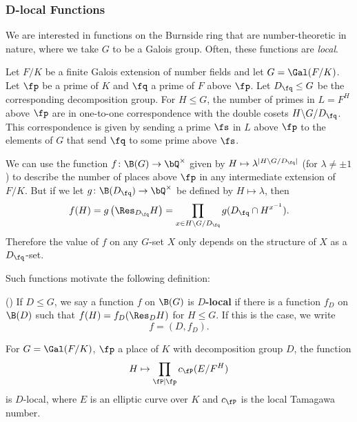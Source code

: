 \subsubsection{D-local Functions}\label{D-loc}

We are interested in functions on the Burnside ring that are number-theoretic in nature, where we take $G$ to be a Galois group. Often, these functions are \textit{local}. 

\begin{example}
Let $F / K$ be a finite Galois extension of number fields and let $G = \Gal(F / K)$. Let $\fp$ be a prime of $K$ and $\fq$ a prime of $F$ above $\fp$. Let $D_{\fq} \leq G$ be the corresponding decomposition group. For $H \leq G$, the number of primes in $L = F^{H}$ above $\fp$ are in one-to-one correspondence with the double cosets $H \backslash G / D_{\fq}$. This correspondence is given by sending a prime $\fs$ in $L$ above $\fp$ to the elements of $G$ that send $\fq$ to some prime above $\fs$.

We can use the function $f \colon \B(G) \to \bQ^{\times}$ given by $H \mapsto  \lambda^{| H \backslash G / D_{\fq}|}$ (for $\lambda \not= \pm 1$) to describe the number of places above $\fp$ in any intermediate extension of $F / K$. But if we let $g \colon \B(D_{\fq}) \to \bQ^{\times}$ be defined by $H \mapsto \lambda$, then 
        \[ f(H) = g\left(\Res_{D_{\fq}} H\right) = \prod_{x \in H \backslash G / D_{\fq}} g(D_{\fq} \cap H^{x^{-1}}) .\]
Therefore the value of $f$ on any $G$-set $X$ only depends on the structure of $X$ as a $D_{\fq}$-set.
\end{example}

Such functions motivate the following definition:

\begin{defn}(\cite[Definition 2.33]{reg-const})\label{D-loc-fn}
    If $D \leq G$, we say a function $f$ on $\B(G)$ is \textbf{$D$-local} if there is a function $f_D$ on $\B(D)$ such that $f(H) = f_D(\Res_D H)$ for $H \leq G$.
    If this is the case, we write
    \[ f = (D, f_D). \]
\end{defn}

\begin{example}\label{tama-ex}
    For $G = \Gal(F / K)$, $\fp$ a place of $K$ with decomposition group $D$, the function
    \[ H \mapsto \prod_{\fP | \fp} c_{\fP}(E / F^{H}) \]
    is $D$-local, where $E$ is an elliptic curve over $K$ and $c_{\fP}$ is the local Tamagawa number.
\end{example}

